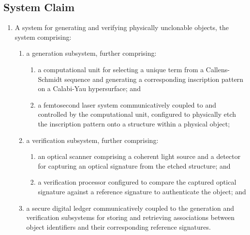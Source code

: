 \documentclass{article}
\begin{document}
\subsection{System Claim}
\begin{enumerate}
    \item[1.] A system for generating and verifying physically unclonable objects, the system comprising:
    \begin{enumerate}
        \item[(a)] a generation subsystem, further comprising:
        \begin{enumerate}
            \item[(i)] a computational unit for selecting a unique term from a Callens-Schmidt sequence and generating a corresponding inscription pattern on a Calabi-Yau hypersurface; and
            \item[(ii)] a femtosecond laser system communicatively coupled to and controlled by the computational unit, configured to physically etch the inscription pattern onto a structure within a physical object;
        \end{enumerate}
        \item[(b)] a verification subsystem, further comprising:
        \begin{enumerate}
            \item[(i)] an optical scanner comprising a coherent light source and a detector for capturing an optical signature from the etched structure; and
            \item[(ii)] a verification processor configured to compare the captured optical signature against a reference signature to authenticate the object; and
        \end{enumerate}
        \item[(c)] a secure digital ledger communicatively coupled to the generation and verification subsystems for storing and retrieving associations between object identifiers and their corresponding reference signatures.
    \end{enumerate}
\end{enumerate}
\end{document}
